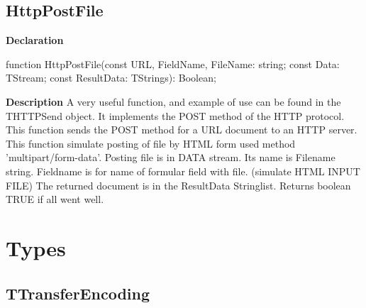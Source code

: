 \documentclass{report}
\newif\ifpdf
\begin{document}
\subsection*{HttpPostFile}
\fi
\label{httpsend-HttpPostFile}
\begin{list}{}{
\setlength{\itemindent}{0cm}
\setlength{\listparindent}{0cm}
\setlength{\leftmargin}{\evensidemargin}
\addtolength{\leftmargin}{\tmplength}
\settowidth{\labelsep}{X}
\addtolength{\leftmargin}{\labelsep}
\setlength{\labelwidth}{\tmplength}
}
\item[\textbf{Declaration}\hfill]
\ifpdf
\begin{flushleft}
\fi
\begin{ttfamily}
function HttpPostFile(const URL, FieldName, FileName: string; const Data: TStream; const ResultData: TStrings): Boolean;\end{ttfamily}

\ifpdf
\end{flushleft}
\fi

\par
\item[\textbf{Description}]
A very useful function, and example of use can be found in the THTTPSend object. It implements the POST method of the HTTP protocol. This function sends the POST method for a URL document to an HTTP server. This function simulate posting of file by HTML form used method 'multipart/form{-}data'. Posting file is in DATA stream. Its name is Filename string. Fieldname is for name of formular field with file. (simulate HTML INPUT FILE) The returned document is in the ResultData Stringlist. Returns boolean TRUE if all went well.

\end{list}
\section{Types}
\ifpdf
\subsection*{\large{\textbf{TTransferEncoding}}\normalsize\hspace{1ex}\hrulefill}
\else
\end{document}

